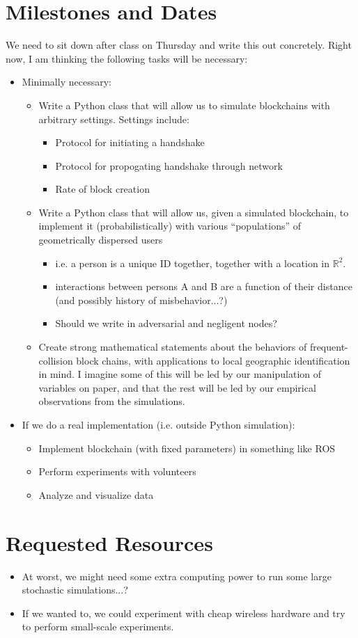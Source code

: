 \documentclass{article}
\begin{document}
\section*{Milestones and Dates}
We need to sit down after class on Thursday and write this out concretely. Right now, I am thinking the following tasks will be necessary:
\begin{itemize}
	\item Minimally necessary:
	\begin{itemize}
		\item Write a Python class that will allow us to simulate blockchains with arbitrary settings. Settings include:
		\begin{itemize}
			\item Protocol for initiating a handshake
			\item Protocol for propogating handshake through network
			\item Rate of block creation
		\end{itemize}
		\item Write a Python class that will allow us, given a simulated blockchain, to implement it (probabilistically) with various ``populations'' of geometrically dispersed users
		\begin{itemize}
			\item i.e. a person is a unique ID together, together with a location in $\mathbb{R}^2$.
			\item interactions between persons A and B are a function of their distance (and possibly history of misbehavior...?)
			\item Should we write in adversarial and negligent nodes?
		\end{itemize}
		\item Create strong mathematical statements about the behaviors of frequent-collision block chains, with applications to local geographic identification in mind. I imagine some of this will be led by our manipulation of variables on paper, and that the rest will be led by our empirical observations from the simulations.
	\end{itemize}
	\item If we do a real implementation (i.e. outside Python simulation):
	\begin{itemize}
		\item Implement blockchain (with fixed parameters) in something like ROS
		\item Perform experiments with volunteers
		\item Analyze and visualize data
	\end{itemize}
\end{itemize}

\section*{Requested Resources}
\begin{itemize}
	\item At worst, we might need some extra computing power to run some large stochastic simulations...?
	\item If we wanted to, we could experiment with cheap wireless hardware and try to perform small-scale experiments.
\end{itemize}
\end{document}
